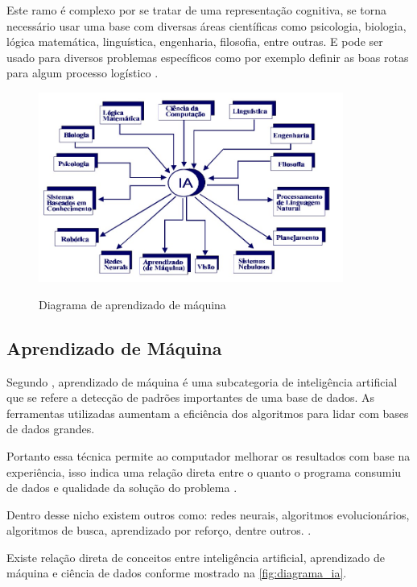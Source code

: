 \documentclass[
	12pt,				%
	openright,			%
	twoside,			%
	a4paper,			%
	english,			%
	french,				%
	spanish,			%
	brazil				%
	]{abntex2}
\begin{document}
Este ramo é complexo por se tratar de uma representação cognitiva, se torna necessário usar uma base com diversas áreas científicas como psicologia, biologia, lógica matemática, linguística, engenharia, filosofia, entre outras. E pode ser usado para diversos problemas específicos como por exemplo definir as boas rotas para algum processo logístico \space\cite{ia_conceitos_aplicacoes}.

\begin{figure}[H]
	\caption{Diagrama de aprendizado de máquina}
	\centering %
	\includegraphics[width=10cm]{figures/areas_ia.jpg} %
	\label{fig:areas_ia}
\end{figure}	

\subsection{Aprendizado de Máquina}

Segundo , aprendizado de máquina é uma subcategoria de inteligência artificial que se refere  a detecção de padrões importantes de uma base de dados. As ferramentas utilizadas aumentam a eficiência dos algoritmos para lidar com bases de dados grandes.

Portanto essa técnica permite ao computador melhorar os resultados com base na experiência, isso indica uma relação direta entre o quanto o programa consumiu de dados e qualidade da solução do problema \cite{ml_explicado}. 

Dentro desse nicho existem outros como: redes neurais, algoritmos evolucionários, algoritmos de busca, aprendizado por reforço, dentre outros. \cite{ml_oil_gas_industry}.

Existe relação direta de conceitos entre inteligência artificial, aprendizado de máquina e ciência de dados conforme mostrado na \cref{fig:diagrama_ia}.
\end{document}
